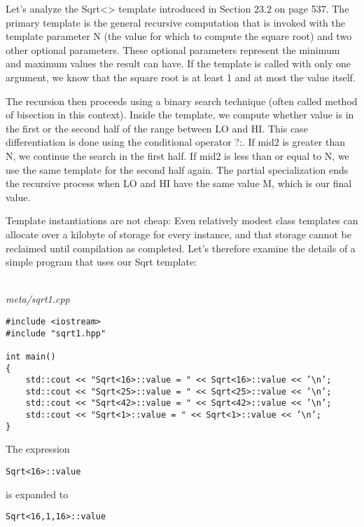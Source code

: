 
Let’s analyze the Sqrt<> template introduced in Section 23.2 on page 537. The primary template is the general recursive computation that is invoked with the template parameter N (the value for which to compute the square root) and two other optional parameters. These optional parameters represent the minimum and maximum values the result can have. If the template is called with only one argument, we know that the square root is at least 1 and at most the value itself.

The recursion then proceeds using a binary search technique (often called method of bisection in this context). Inside the template, we compute whether value is in the first or the second half of the range between LO and HI. This case differentiation is done using the conditional operator ?:. If mid2 is greater than N, we continue the search in the first half. If mid2 is less than or equal to N, we use the same template for the second half again. The partial specialization ends the recursive process when LO and HI have the same value M, which is our final value.

Template instantiations are not cheap: Even relatively modest class templates can allocate over a kilobyte of storage for every instance, and that storage cannot be reclaimed until compilation as completed. Let’s therefore examine the details of a simple program that uses our Sqrt template:

\hspace*{\fill} \\ %
\noindent
\textit{meta/sqrt1.cpp}
\begin{lstlisting}[style=styleCXX]
#include <iostream>
#include "sqrt1.hpp"

int main()
{
	std::cout << "Sqrt<16>::value = " << Sqrt<16>::value << ’\n’;
	std::cout << "Sqrt<25>::value = " << Sqrt<25>::value << ’\n’;
	std::cout << "Sqrt<42>::value = " << Sqrt<42>::value << ’\n’;
	std::cout << "Sqrt<1>::value = " << Sqrt<1>::value << ’\n’;
}
\end{lstlisting}

The expression

\begin{lstlisting}[style=styleCXX]
Sqrt<16>::value
\end{lstlisting}

is expanded to

\begin{lstlisting}[style=styleCXX]
Sqrt<16,1,16>::value
\end{lstlisting}

